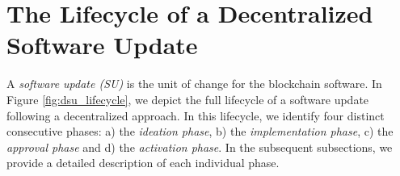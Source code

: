\section{The Lifecycle of a Decentralized Software Update} \label{lifecycle}
A \emph{software update (SU)} is the unit of change for the blockchain
software. In Figure \ref{fig:dsu_lifecycle}, we depict
the full lifecycle of a software update following a decentralized approach. In
this lifecycle, we identify four distinct consecutive phases: a) the
\emph{ideation phase}, b) the \emph{implementation phase}, c) the \emph{approval
  phase} and d) the \emph{activation phase}. In the subsequent subsections, we
provide a detailed description of each individual phase.


